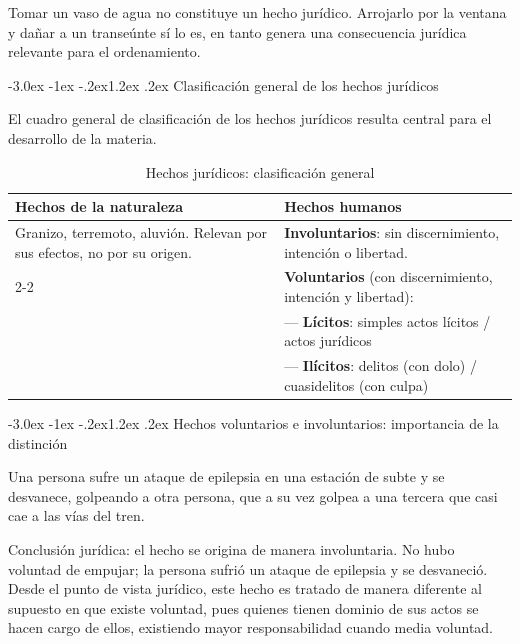 \documentclass[12pt,oneside]{book}
\makeatletter
\renewcommand\section{\@startsection{section}{1}{\z@}%
  {-3.0ex \@plus -1ex \@minus -.2ex}{1.2ex \@plus .2ex}%
  {\normalfont\large\bfseries\color{acento}}}
\makeatother
\begin{document}
\begin{ejemplo}
Tomar un vaso de agua no constituye un hecho jurídico. Arrojarlo por la ventana y dañar a un transeúnte sí lo es, en tanto genera una consecuencia jurídica relevante para el ordenamiento.
\end{ejemplo}

\section{Clasificación general de los hechos jurídicos}
\label{sec:clasifhechos}

El cuadro general de clasificación de los hechos jurídicos resulta central para el desarrollo de la materia.

\begin{table}[H]
\centering
\caption{Hechos jurídicos: clasificación general}
\begin{tabularx}{\textwidth}{X X}
\toprule
\textbf{Hechos de la naturaleza} & \textbf{Hechos humanos} \\
\midrule
Granizo, terremoto, aluvión. Relevan por sus efectos, no por su origen. &
\textbf{Involuntarios}: sin discernimiento, intención o libertad. \\
\cmidrule(l){2-2}
 & \textbf{Voluntarios} (con discernimiento, intención y libertad): \\
 & \quad --- \textbf{Lícitos}: simples actos lícitos / actos jurídicos \\
 & \quad --- \textbf{Ilícitos}: delitos (con dolo) / cuasidelitos (con culpa) \\
\bottomrule
\end{tabularx}
\end{table}

\section{Hechos voluntarios e involuntarios: importancia de la distinción}

\begin{ejemplo}
Una persona sufre un ataque de epilepsia en una estación de subte y se desvanece, golpeando a otra persona, que a su vez golpea a una tercera que casi cae a las vías del tren.

Conclusión jurídica: el hecho se origina de manera involuntaria. No hubo voluntad de empujar; la persona sufrió un ataque de epilepsia y se desvaneció. Desde el punto de vista jurídico, este hecho es tratado de manera diferente al supuesto en que existe voluntad, pues quienes tienen dominio de sus actos se hacen cargo de ellos, existiendo mayor responsabilidad cuando media voluntad.
\end{ejemplo}
\end{document}
